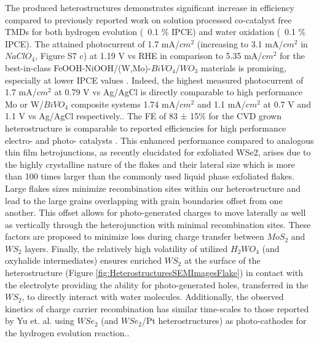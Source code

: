 The produced heterostructures demonstrates significant increase in efficiency compared to previously reported work on solution processed co-catalyst free TMDs for both hydrogen evolution (~0.1 \% IPCE) and water oxidation (~0.1 \% IPCE)\cite{Yu2015}\cite{Fu2015}. The attained photocurrent of 1.7 mA/$cm^2$ (increasing to 3.1 mA/$cm^2$ in $NaClO_4$, Figure S7 c) at 1.19 V vs RHE  in comparison to 5.35 mA/$cm^2$ for the best-in-class FeOOH-NiOOH/(W,Mo)-$BiVO_4$/$WO_3$ materials is promising, especially at lower IPCE values \cite{Shi2014a}. Indeed, the highest measured photocurrent of 1.7 mA/$cm^2$ at 0.79 V vs Ag/AgCl is directly comparable to high performance Mo or W/$BiVO_4$ composite systems 1.74 mA/$cm^2$ and 1.1 mA/$cm^2$ at 0.7 V and 1.1 V vs Ag/AgCl respectively.\cite{Hong2011}\cite{Pilli2011}. The FE of 83 ± 15\% for the CVD grown heterostructure is comparable to reported efficiencies for high performance electro- and photo- catalysts \cite{McCrory2015}.
This enhanced performance compared to analogous thin film hetrojunctions, \cite{Fu2015} as recently elucidated for exfoliated WSe2,\cite{Yu2017}\cite{Yu2017a} arises due to the highly crystalline nature of the flakes and their lateral size which is more than 100 times larger than the commonly used liquid phase exfoliated flakes. Large flakes sizes minimize recombination sites within our heterostructure and lead to the large grains overlapping with grain boundaries offset from one another. This offset allows for photo-generated charges to move laterally as well as vertically through the heterojunction with minimal recombination sites. These factors are proposed to minimize loss during charge transfer between $MoS_2$ and $WS_2$ layers. Finally, the relatively high volatility of utilized $H_2WO_4$ (and oxyhalide intermediates) ensures enriched $WS_2$ at the surface of the heterostructure (Figure \ref{fig:HeterostructuresSEMImagesFlake}) in contact with the electrolyte providing the ability for photo-generated holes, transferred in the $WS_2$, to directly interact with water molecules. Additionally, the observed kinetics of charge carrier recombination has similar time-scales to those reported by Yu et. al. using $WSe_2$ (and $WSe_2$/Pt heterostructures) as photo-cathodes for the hydrogen evolution reaction.\cite{Yu2015}\cite{Yu2017}\cite{Yu2016}.
